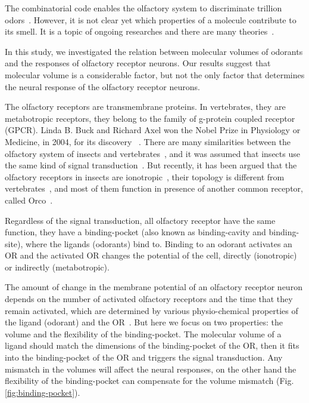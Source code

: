 \documentclass[11pt]{paper} %
\begin{document}
The combinatorial code enables the olfactory system to discriminate trillion odors~\cite{Bushdid2014}.
However, it is not clear yet which properties of a molecule contribute to its smell. It is a topic of ongoing researches and there are many theories~\cite{Turin,Keller2004,Araneda2000,Brookes2007,Franco2011,Pelz2006,Gabler2013,Schmuker2007,Haddad2008,Snitz2013,Yablonka2012,gane2013}.

In this study, 
we investigated the relation between molecular volumes of odorants and the responses of olfactory receptor neurons. 
Our results suggest that molecular volume is a considerable factor, 
but not the only factor that determines the neural response of the olfactory receptor neurons.

The olfactory receptors are transmembrane proteins.
In vertebrates, they are metabotropic receptors, they belong to the family of g-protein coupled receptor (GPCR). 
Linda B. Buck and Richard Axel won the Nobel Prize in Physiology or Medicine, in 2004, 
for its discovery ~\cite{Buck1991}.
There are many similarities between the olfactory system of insects and vertebrates~\cite{Wilson2014,Kaupp2010}, 
and it was assumed that insects use the same kind of signal transduction~\cite{Brody2000,Hill04102002}. 
But recently, it has been argued that the olfactory receptors in insects are ionotropic~\cite{Sato2008,Wicher2008,Nagel2011,Rong2011}, 	
their topology is different from vertebrates~\cite{Benton2006,Smart2008},
and most of them function in presence of another common receptor, called Orco~\cite{Larsson2004}.


Regardless of the signal transduction, 
all olfactory receptor have the same function, they have a binding-pocket (also known as binding-cavity and binding-site),
where the ligands (odorants) bind to. 
Binding to an odorant activates an OR and 
the activated OR changes the potential of the cell, 
directly (ionotropic) or indirectly (metabotropic).

The amount of change in the membrane potential of an olfactory receptor neuron depends on the number of activated olfactory receptors and the time that they remain activated,
which are determined by various physio-chemical properties of the ligand (odorant) and the OR~\cite{Turin,Araneda2000,Gabler2013,guerrieri2005,uchida2000}. 
But here we focus on two properties: the volume and the flexibility of the binding-pocket.
The molecular volume of a ligand should match the dimensions of the binding-pocket of the OR,
then it fits into the binding-pocket of the OR and triggers the signal transduction. 
Any mismatch in the volumes will affect the neural responses, 
on the other hand the flexibility of the binding-pocket can compensate for the volume mismatch (Fig. \ref{fig:binding-pocket}).
\end{document}
